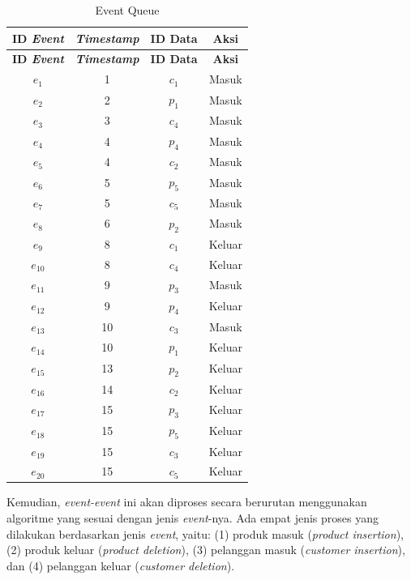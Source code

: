 \begin{small}
	\begin{longtable}{|c|c|c|c|}
		\caption{Event Queue \label{tab:event-queue}}
		\hline
		\multicolumn{1}{|c|}{\textbf{ID \textit{Event}}} & \multicolumn{1}{c|}{\textbf{\textit{Timestamp}}} & \multicolumn{1}{c}{\textbf{ID Data}} & \multicolumn{1}{|c|}{\textbf{Aksi}} \\ \hline 
		\endfirsthead
		\hline
		\multicolumn{1}{|c|}{\textbf{ID \textit{Event}}} & \multicolumn{1}{c|}{\textbf{\textit{Timestamp}}} & \multicolumn{1}{c}{\textbf{ID Data}} & \multicolumn{1}{|c|}{\textbf{Aksi}} \\ \hline
		\endhead
		$e_1$ & 1 & $c_1$ & Masuk \\ \hline
		$e_2$ & 2 & $p_1$ & Masuk \\ \hline
		$e_3$ & 3 & $c_4$ & Masuk \\ \hline
		$e_4$ & 4 & $p_4$ & Masuk \\ \hline
		$e_5$ & 4 & $c_2$ & Masuk \\ \hline
		$e_6$ & 5 & $p_5$ & Masuk \\ \hline
		$e_7$ & 5 & $c_5$ & Masuk \\ \hline
		$e_8$ & 6 & $p_2$ & Masuk \\ \hline
		$e_9$ & 8 & $c_1$ & Keluar \\ \hline
		$e_{10}$ & 8 & $c_4$ & Keluar \\ \hline
		$e_{11}$ & 9 & $p_3$ & Masuk \\ \hline
		$e_{12}$ & 9 & $p_4$ & Keluar \\ \hline
		$e_{13}$ & 10 & $c_3$ & Masuk \\ \hline
		$e_{14}$ & 10 & $p_1$ & Keluar \\ \hline
		$e_{15}$ & 13 & $p_2$ & Keluar \\ \hline
		$e_{16}$ & 14 & $c_2$ & Keluar \\ \hline
		$e_{17}$ & 15 & $p_3$ & Keluar \\ \hline
		$e_{18}$ & 15 & $p_5$ & Keluar \\ \hline
		$e_{19}$ & 15 & $c_3$ & Keluar \\ \hline
		$e_{20}$ & 15 & $c_5$ & Keluar \\ \hline
	\end{longtable}
\end{small}

Kemudian, \textit{event-event} ini akan diproses secara berurutan menggunakan algoritme yang sesuai dengan jenis \textit{event}-nya. Ada empat jenis proses yang dilakukan berdasarkan jenis \textit{event}, yaitu: (1) produk masuk (\textit{product insertion}), (2) produk keluar (\textit{product deletion}), (3) pelanggan masuk (\textit{customer insertion}), dan (4) pelanggan keluar (\textit{customer deletion}). 

